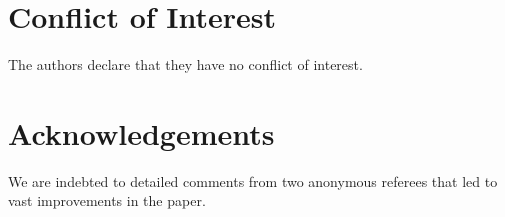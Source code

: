 \documentclass[11pt]{article}
\begin{document}
\section*{Conflict of Interest}
The authors declare that they have no conflict of interest.


\section*{Acknowledgements}
We are indebted to detailed comments from two anonymous referees that led to vast improvements in the
paper.




\def\cprime{$'$}
\providecommand{\bysame}{\leavevmode\hbox to3em{\hrulefill}\thinspace}
\providecommand{\MR}{\relax\ifhmode\unskip\space\fi MR }
\providecommand{\MRhref}[2]{%
  \href{http://www.ams.org/mathscinet-getitem?mr=#1}{#2}
}
\providecommand{\href}[2]{#2}
\end{document}
